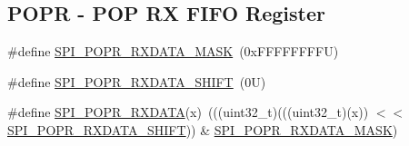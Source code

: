 \subsection*{P\+O\+PR -\/ P\+OP RX F\+I\+FO Register}
\begin{DoxyCompactItemize}
\item 
\#define \mbox{\hyperlink{group___s_p_i___register___masks_ga3d2d3998529fd7de17cac99d625fe004}{S\+P\+I\+\_\+\+P\+O\+P\+R\+\_\+\+R\+X\+D\+A\+T\+A\+\_\+\+M\+A\+SK}}~(0x\+F\+F\+F\+F\+F\+F\+F\+F\+U)
\item 
\#define \mbox{\hyperlink{group___s_p_i___register___masks_ga862819a722e0ccbd3f03edce9b82e5c2}{S\+P\+I\+\_\+\+P\+O\+P\+R\+\_\+\+R\+X\+D\+A\+T\+A\+\_\+\+S\+H\+I\+FT}}~(0\+U)
\item 
\#define \mbox{\hyperlink{group___s_p_i___register___masks_gae6858b63bc7af767270dafed1e9c5060}{S\+P\+I\+\_\+\+P\+O\+P\+R\+\_\+\+R\+X\+D\+A\+TA}}(x)~(((uint32\+\_\+t)(((uint32\+\_\+t)(x)) $<$$<$ \mbox{\hyperlink{group___s_p_i___register___masks_ga862819a722e0ccbd3f03edce9b82e5c2}{S\+P\+I\+\_\+\+P\+O\+P\+R\+\_\+\+R\+X\+D\+A\+T\+A\+\_\+\+S\+H\+I\+FT}})) \& \mbox{\hyperlink{group___s_p_i___register___masks_ga3d2d3998529fd7de17cac99d625fe004}{S\+P\+I\+\_\+\+P\+O\+P\+R\+\_\+\+R\+X\+D\+A\+T\+A\+\_\+\+M\+A\+SK}})
\end{DoxyCompactItemize}
